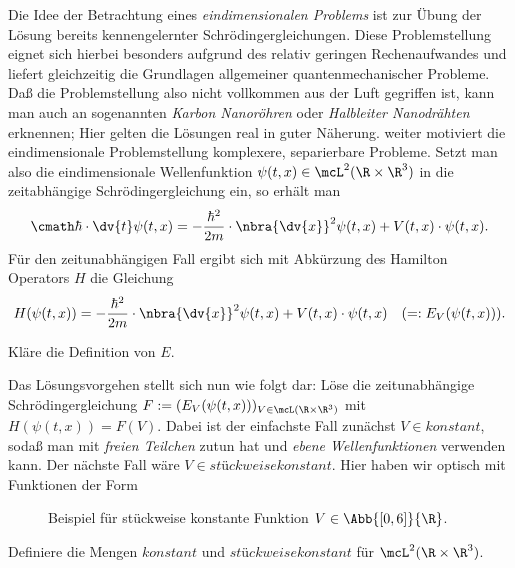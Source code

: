 \documentclass{subfiles}
\begin{document}

    Die Idee der Betrachtung eines \emph{eindimensionalen Problems} ist zur Übung der Lösung bereits kennengelernter Schrödingergleichungen. Diese Problemstellung eignet sich hierbei besonders aufgrund des relativ geringen Rechenaufwandes und liefert gleichzeitig die Grundlagen allgemeiner quantenmechanischer Probleme. Daß die Problemstellung also nicht vollkommen aus der Luft gegriffen ist, kann man auch an sogenannten \emph{Karbon Nanoröhren} oder \emph{Halbleiter Nanodrähten} erknennen; Hier gelten die Lösungen real in guter Näherung. weiter motiviert die eindimensionale Problemstellung komplexere, separierbare Probleme. Setzt man also die eindimensionale Wellenfunktion $\psi(t,x)\in\mcL^2(\R\times\R^3)$ in die zeitabhängige Schrödingergleichung ein, so erhält man
    \[\cmath\hbar\cdot \dv{t}\psi(t,x) = -\frac{\hbar^2}{2m}\cdot\nbra{\dv{x}}^2\psi(t,x) + V(t,x)\cdot\psi(t,x).\]
    Für den zeitunabhängigen Fall ergibt sich mit Abkürzung des Hamilton Operators $H$ die Gleichung
    \[H(\psi(t,x)) = -\frac{\hbar^2}{2m}\cdot\nbra{\dv{x}}^2\psi(t,x) + V(t,x)\cdot\psi(t,x) \quad (=: E_V(\psi(t,x))).\]

    \begin{Aufgabe}
        \nr{} Kläre die Definition von $E$. 
    \end{Aufgabe}
    Das Lösungsvorgehen stellt sich nun wie folgt dar: Löse die zeitunabhängige Schrödingergleichung $F:=(E_V(\psi(t,x)))_{V\in\mcL(\R\times\R^3)}$ mit $H(\psi(t,x)) = F(V)$. Dabei ist der einfachste Fall zunächst $V\in\textit{konstant}$, sodaß man mit \emph{freien Teilchen} zutun hat und \emph{ebene Wellenfunktionen} verwenden kann. Der nächste Fall wäre $V\in\textit{stückweisekonstant}$. Hier haben wir optisch mit Funktionen der Form 
    \begin{figure}[H]
        \centering
        \caption{Beispiel für stückweise konstante Funktion $V\in\Abb{[0,6]}{\R}$.}
    \end{figure}
    \begin{Aufgabe}
        \nr{} Definiere die Mengen $\textit{konstant}$ und $\textit{stückweisekonstant}$ für $\mcL^2(\R\times\R^3)$. 
    \end{Aufgabe}
\end{document}
